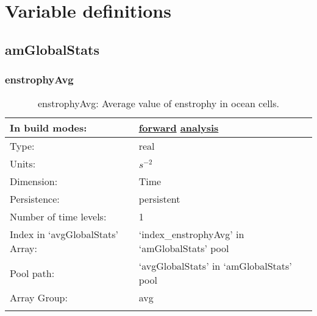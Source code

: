 \chapter[Variable definitions]{Variable definitions}
\label{chap:variable_sections}
\section[amGlobalStats]{amGlobalStats}
\label{sec:var_sec_amGlobalStats}
\subsection[enstrophyAvg]{enstrophyAvg}
\label{subsec:var_sec_amGlobalStats_enstrophyAvg}
\begin{center}
\begin{longtable}{| p{2.0in} | p{4.0in} |}
        \hline 
        In build modes: & \hyperref[subsec:forward_var_tab_amGlobalStats]{forward} \hyperref[subsec:analysis_var_tab_amGlobalStats]{analysis} \\
        \hline 
        Type: & real \\
        \hline 
        Units: & $s^{-2}$ \\
        \hline 
        Dimension: & Time \\
        \hline 
        Persistence: & persistent \\
        \hline 
        Number of time levels: & 1 \\
        \hline 
		 Index in `avgGlobalStats' Array: & `index\_enstrophyAvg' in `amGlobalStats' pool \\
		 \hline 
            Pool path: & `avgGlobalStats' in `amGlobalStats' pool \\
		 \hline 
		 Array Group: & avg \\
		 \hline 
    \caption{enstrophyAvg: Average value of enstrophy in ocean cells.}
\end{longtable}
\end{center}
